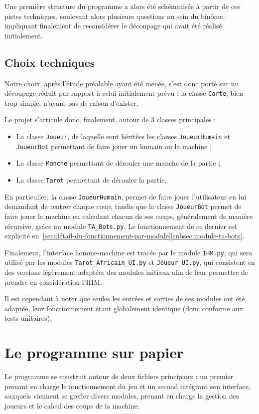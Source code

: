       Une première structure du programme a alors été schématisée à partir de ces pistes techniques, soulevant alors plusieurs questions au sein du binôme, impliquant finalement de reconsidérer le découpage qui avait été réalisé initialement.

   \subsection{Choix techniques}\label{subsec:choix-techniques}
      Notre choix, après l'étude préalable ayant été menée, s'est donc porté sur un découpage réduit par rapport à celui initialement prévu : la classe \texttt{Carte}, bien trop simple, n'ayant pas de raison d'exister.

      Le projet s'articule donc, finalement, autour de 3 classes principales :
      \begin{itemize}
         \item La classe \texttt{Joueur}, de laquelle sont héritées les classes \texttt{JoueurHumain} et \texttt{JoueurBot} permettant de faire jouer un humain ou la machine ;
         \item La classe \texttt{Manche} permettant de dérouler une manche de la partie ;
         \item La classe \texttt{Tarot} permettant de dérouler la partie.
      \end{itemize}

      En particulier, la classe \texttt{JoueurHumain}, permet de faire jouer l'utilisateur en lui demandant de rentrer chaque coup, tandis que la classe \texttt{JoueurBot} permet de faire jouer la machine en calculant chacun de ses coups, généralement de manière récursive, grâce au module \texttt{TA\_Bots.py}.
      Le fonctionnement de ce dernier est explicité en~\ref{sec:détail-du-fonctionnement-par-module}\ref{subsec:module-ta-bots}.

      Finalement, l'interface homme-machine est tracée par le module \texttt{IHM.py}, qui sera utilisé par les modules \texttt{Tarot\_Africain\_UI.py} et \texttt{Joueur\_UI.py}, qui consistent en des versions légèrement adaptées des modules initiaux afin de leur permettre de prendre en considération l'IHM\@.

      Il est cependant à noter que seules les entrées et sorties de ces modules ont été adaptée, leur fonctionnement étant globalement identique (donc conforme aux tests unitaires).


\section{Le programme sur papier}\label{sec:le-programme-sur-papier}
   Le programme se construit autour de deux fichiers principaux : un premier prenant en charge le fonctionnement du jeu et un second intégrant son interface, auxquels viennent se greffer divers modules, prenant en charge la gestion des joueurs et le calcul des coups de la machine.

